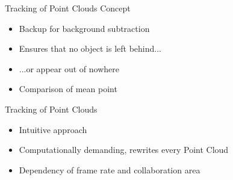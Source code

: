 
\begin{frame}{Tracking of Point Clouds}
Concept
	\begin{itemize}
	\item Backup for background subtraction
	\item Ensures that no object is left behind...
	\item ...or appear out of nowhere
	\item Comparison of mean point
	\end{itemize}
\end{frame}

\begin{frame}{Tracking of Point Clouds}

	\begin{itemize}
	\item Intuitive approach
	\item Computationally demanding, rewrites every Point Cloud
	\item Dependency of frame rate and collaboration area
	\end{itemize}
\end{frame}